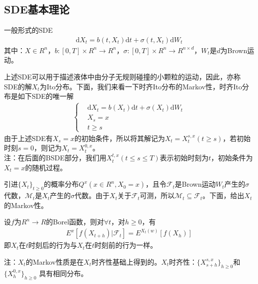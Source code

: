     \subsection{SDE基本理论}
        \par
        一般形式的SDE
        \begin{align*}
        \mathrm{d}X_t = b(t,X_t)\mathrm{d}t+\sigma(t,X_t)\mathrm{d}W_t
        \end{align*}
        其中：$X\in R^n$，$b:[0,T]\times R^n \rightarrow R^n$，$\sigma:[0,T]\times R^n \rightarrow R^{n\times d}$，$W_t$是$d$为Brown运动。
        \par
        上述SDE可以用于描述液体中由分子无规则碰撞的小颗粒的运动，因此，亦称SDE的解$X_t$为Ito分布。下面，我们来看一下时齐Ito分布的Markov性，时齐Ito分布是如下SDE的唯一解
        \begin{align*}
        \left\{
            \begin{aligned}
            &\mathrm{d}X_t = b(X_t)\mathrm{d}t+\sigma (X_t)\mathrm{d}W_t\\
            &X_s = x\\
            &t \geqslant s
            \end{aligned}
        \right.
        \end{align*}
        由于上述SDE有$X_s= x$的初始条件，所以将其解记为$X_t = X_t^{s,x}(t \geqslant s)$，若初始时刻$s = 0$，则记为$X_t = X_t^{0,x}$。\\
        注：在后面的BSDE部分，我们用$X_t^{t,x}(t \leqslant s \leqslant T)$表示初始时刻为$t$，初始条件为$X_t = x$的随机过程。
        \par
        引进$\{X_t\}_{t \geqslant 0}$的概率分布$Q^x(x\in R^n,X_0 = x)$，且令$\mathcal{F}_t$是Brown运动$W_t$产生的$\sigma$代数，$\mathcal{M}_t$是$X_t$产生的$\sigma$代数。由于$X_t$关于$\mathcal{F}_t$可测，所以$\mathcal{M}_t \subseteq \mathcal{F}_t$。下面，给出$X_t$的Markov性。
        \begin{theorem}[Ito分布的Markov性]
        设$f$为$R^n \rightarrow R$的Borel函数，则对$\forall t$，对$h \geqslant 0$，有
        \begin{align*}
        E^x\left[f(X_{t+h})|\mathcal{F}_t\right] = E^{X_t(w)}[f(X_h)]
        \end{align*}
        即$X_t$在$t$时刻后的行为与$X_t$在$t$时刻前的行为一样。
        \end{theorem}
        注：$X_t$的Markov性质是在$X_t$时齐性基础上得到的。$X_t$时齐性：$\{X_{s+h}^{s,x}\}_{h \geqslant 0 }$和 $\{X_{h}^{0,x}\}_{h \geqslant 0 }$ 具有相同分布。
        \par
